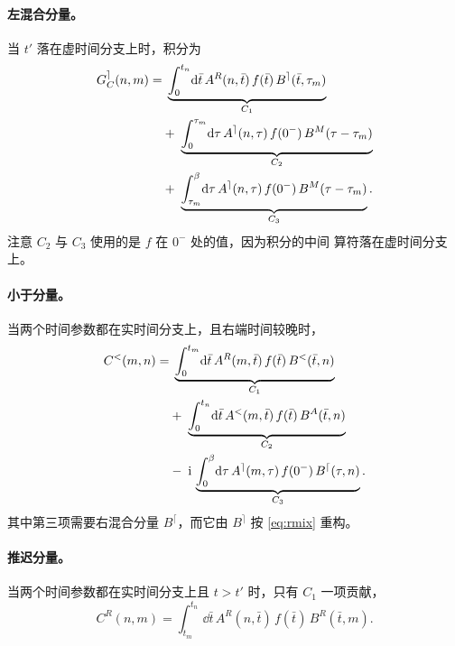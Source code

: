 \paragraph{左混合分量。}
当 $t'$ 落在虚时间分支上时，积分为
\begin{equation}
\begin{aligned}
    G^{\rceil}_{C}(n,m)
    =
    &\;\underbrace{\int^{t_n}_{0}\!\mathrm{d}\bar{t}\,
        A^{R}(n,\bar{t})\,f(\bar{t})\,B^{\rceil}(\bar{t},\tau_m)}_{C_1} \\
    &+\;\underbrace{\int^{\tau_m}_{0}\!\mathrm{d}\tau\,
        A^{\rceil}(n,\tau)\,f(0^{-})\,B^{M}(\tau-\tau_m)}_{C_2} \\
    &+\;\underbrace{\int^{\beta}_{\tau_m}\!\mathrm{d}\tau\,
        A^{\rceil}(n,\tau)\,f(0^{-})\,B^{M}(\tau-\tau_m)}_{C_3} .
\end{aligned}
\label{eq:langreth-lmix}
\end{equation}
注意 $C_2$ 与 $C_3$ 使用的是 $f$ 在 $0^{-}$ 处的值，因为积分的中间
算符落在虚时间分支上。

\paragraph{小于分量。}
当两个时间参数都在实时间分支上，且右端时间较晚时，
\begin{equation}
\begin{aligned}
    C^{<}(m,n)
    =
    &\;\underbrace{\int^{t_m}_{0}\!\mathrm{d}\bar{t}\,
        A^{R}(m,\bar{t})\,f(\bar{t})\,B^{<}(\bar{t},n)}_{C_1} \\
    &+\;\underbrace{\int^{t_n}_{0}\!\mathrm{d}\bar{t}\,
        A^{<}(m,\bar{t})\,f(\bar{t})\,B^{A}(\bar{t},n)}_{C_2} \\
    &-\;\mathrm{i}\,\underbrace{\int^{\beta}_{0}\!\mathrm{d}\tau\,
        A^{\rceil}(m,\tau)\,f(0^{-})\,B^{\lceil}(\tau,n)}_{C_3} .
\end{aligned}
\label{eq:langreth-less}
\end{equation}
其中第三项需要右混合分量 $B^{\lceil}$，而它由 $B^{\rceil}$ 按
\cref{eq:rmix} 重构。

\paragraph{推迟分量。}
当两个时间参数都在实时间分支上且 $t>t'$ 时，只有 $C_1$ 一项贡献，
\begin{equation}
    C^{R}(n,m) = \int^{t_n}_{t_m}\!\dd\bar{t}\,
        A^{R}(n,\bar{t})\,f(\bar{t})\,B^{R}(\bar{t},m).
    \label{eq:langreth-ret}
\end{equation}

